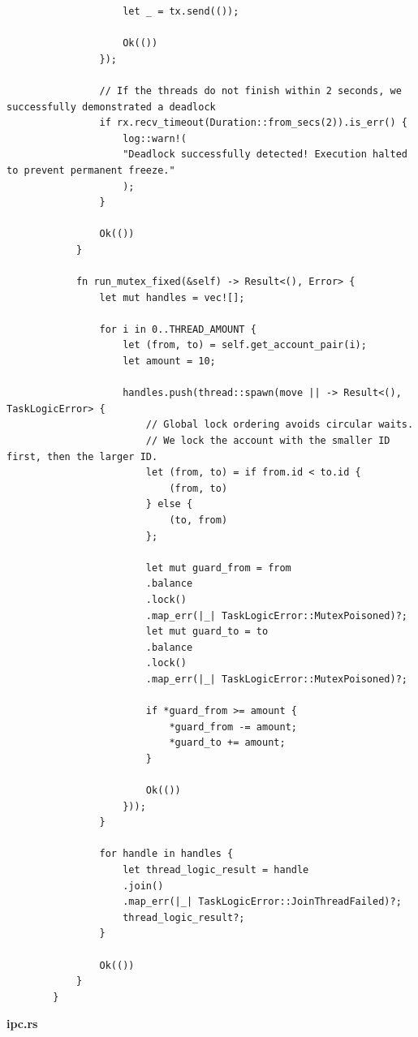 \documentclass[14pt, a4paper]{extreport}
\begin{document}
\begin{verbatim}
					let _ = tx.send(());
					
					Ok(())
				});
				
				// If the threads do not finish within 2 seconds, we successfully demonstrated a deadlock
				if rx.recv_timeout(Duration::from_secs(2)).is_err() {
					log::warn!(
					"Deadlock successfully detected! Execution halted to prevent permanent freeze."
					);
				}
				
				Ok(())
			}
			
			fn run_mutex_fixed(&self) -> Result<(), Error> {
				let mut handles = vec![];
				
				for i in 0..THREAD_AMOUNT {
					let (from, to) = self.get_account_pair(i);
					let amount = 10;
					
					handles.push(thread::spawn(move || -> Result<(), TaskLogicError> {
						// Global lock ordering avoids circular waits.
						// We lock the account with the smaller ID first, then the larger ID.
						let (from, to) = if from.id < to.id {
							(from, to)
						} else {
							(to, from)
						};
						
						let mut guard_from = from
						.balance
						.lock()
						.map_err(|_| TaskLogicError::MutexPoisoned)?;
						let mut guard_to = to
						.balance
						.lock()
						.map_err(|_| TaskLogicError::MutexPoisoned)?;
						
						if *guard_from >= amount {
							*guard_from -= amount;
							*guard_to += amount;
						}
						
						Ok(())
					}));
				}
				
				for handle in handles {
					let thread_logic_result = handle
					.join()
					.map_err(|_| TaskLogicError::JoinThreadFailed)?;
					thread_logic_result?;
				}
				
				Ok(())
			}
		}
	\end{verbatim}
	
	\textbf{ipc.rs}
	
\end{document}
